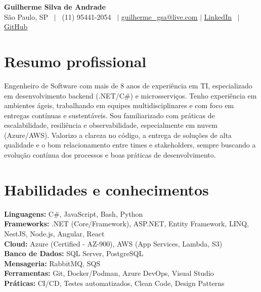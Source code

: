 \documentclass[letterpaper,11pt]{article}
\begin{document}
\begin{center}
    \textbf{\Huge \bfseries Guilherme Silva de Andrade} \\ \vspace{1pt}
    \small São Paulo, SP \ $|$ \ (11) 95441-2054 \ $|$ 
    \href{mailto:guilherme\_gsa@live.com}{\underline{guilherme\_gsa@live.com}} $|$ 
    \href{https://www.linkedin.com/in/xgandrade}{LinkedIn} \ $|$ 
    \href{https://github.com/xgandrade}{GitHub}
\end{center}

\section{Resumo profissional}
\justifying
Engenheiro de Software com mais de 8 anos de experiência em TI, especializado em desenvolvimento backend (.NET/C\#) e microsserviços. Tenho experiência em ambientes ágeis, trabalhando em equipes multidisciplinares e com foco em entregas contínuas e sustentáveis. Sou familiarizado com práticas de escalabilidade, resiliência e observabilidade, especialmente em nuvem (Azure/AWS). Valorizo a clareza no código, a entrega de soluções de alta qualidade e o bom relacionamento entre times e stakeholders, sempre buscando a evolução contínua dos processos e boas práticas de desenvolvimento.

\section{Habilidades e conhecimentos}
 \begin{itemize}[leftmargin=0.15in, label={}]
    \small{\item{
        \textbf{Linguagens:} C\#, JavaScript, Bash, Python \\
        \textbf{Frameworks:} .NET (Core/Framework), ASP.NET, Entity Framework, LINQ, NestJS, Node.js, Angular, React \\
        \textbf{Cloud:} Azure (Certified - AZ-900), AWS (App Services, Lambda, S3) \\
        \textbf{Banco de Dados:} SQL Server, PostgreSQL \\
        \textbf{Mensageria:} RabbitMQ, SQS \\
        \textbf{Ferramentas:} Git, Docker/Podman, Azure DevOps, Visual Studio \\
        \textbf{Práticas:} CI/CD, Testes automatizados, Clean Code, Design Patterns
    }}
 \end{itemize}
\end{document}
